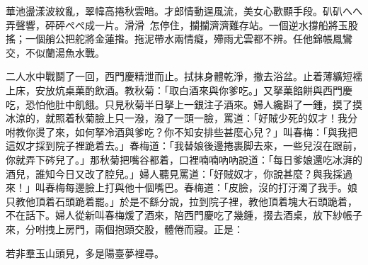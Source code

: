 \begin{myquote}
華池盪漾波紋亂，翠幃高捲秋雲暗。才郎情動逞風流，美女心歡顯手段。𥐙𥐙へへ弄聲響，砰砰ぺぺ成一片。滑滑𣺥𣺥怎停住，攔攔濟濟難存站。一個逆水撐船將玉股搖；一個艄公把舵將金蓮揝。拖泥帶水兩情癡，殢雨尤雲都不辨。任他錦帳鳳鸞交，不似蘭湯魚水戰。
\end{myquote}

二人水中戰鬬了一回，西門慶精泄而止。拭抹身體乾淨，撤去浴盆。止着薄纊短襦上床，安放炕桌菓酌飲酒。教秋菊：「取白酒來與你爹吃。」又拏菓餡餅與西門慶吃，恐怕他肚中飢餓。只見秋菊半日拏上一銀注子酒來。婦人纔斟了一鍾，摸了摸冰涼的，就照着秋菊臉上只一潑，潑了一頭一臉，罵道：「好賊少死的奴才！我分咐教你燙了來，如何拏冷酒與爹吃？你不知安排些甚麼心兒？」叫春梅：「與我把這奴才採到院子裡跪着去。」春梅道：「我替娘後邊捲裹脚去來，一些兒沒在跟前，你就弄下硶兒了。」那秋菊把嘴谷都着，口裡喃喃吶吶說道：「每日爹娘還吃冰湃的酒兒，誰知今日又改了腔兒。」婦人聽見罵道：「好賊奴才，你說甚麼？與我採過來！」叫春梅每邊臉上打與他十個嘴巴。春梅道：「皮臉，沒的打汙濁了我手。娘只教他頂着石頭跪着罷。」於是不繇分說，拉到院子裡，教他頂着塊大石頭跪着，不在話下。婦人從新叫春梅煖了酒來，陪西門慶吃了幾鍾，掇去酒桌，放下紗帳子來，分咐拽上房門，兩個抱頭交股，體倦而寢。正是：

\begin{myquote}
若非羣玉山頭見，多是陽臺夢裡尋。
\end{myquote}


